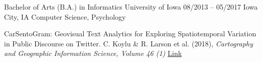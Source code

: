 

\begin{cventries}
  \education
    {Bachelor of Arts (B.A.) in Informatics} 		%
    {University of Iowa} 							%
		{08/2013 – 05/2017} 						%
    {Iowa City, IA} 								%
		{Computer Science, Psychology}
		{}
\end{cventries}

\vspace{-2.0mm}
{}
\begin{cvhonors}
	\cvhonor
		{CarSentoGram: Geovisual Text Analytics for Exploring Spatiotemporal Variation in Public Discourse on Twitter. C. Koylu \& R. Larson et al. (2018), \textit{Cartography and Geographic Information Science, Volume 46 (1)}}
		{\href{https://www.tandfonline.com/doi/full/10.1080/15230406.2018.1510343}{Link}}
\end{cvhonors}

\vspace{-2mm}